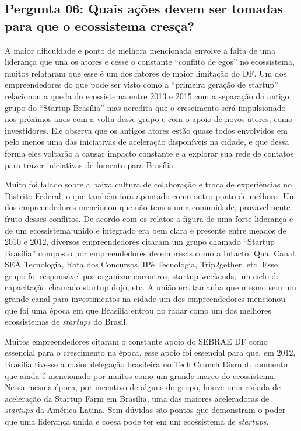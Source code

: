 \subsection*{Pergunta 06: Quais ações devem ser tomadas para que o ecossistema cresça?}
\label{subsection:pergunta_de_pesquisa_6}

A maior dificuldade e ponto de melhora mencionada envolve a falta de uma liderança que una os atores e cesse o constante ``conflito de egos'' no ecossistema, muitos relataram que esse é um dos fatores de maior limitação do DF. Um dos empreendedores do que pode ser visto como a ``primeira geração de startup'' relacionou a queda do ecossistema entre 2013 e 2015 com a separação do antigo grupo do ``Startup Brasília'' mas acredita que o crescimento será impulsionado nos próximos anos com a volta desse grupo e com o apoio de novos atores, como investidores. Ele observa que os antigos atores estão quase todos envolvidos em pelo menos uma das iniciativas de aceleração disponíveis na cidade, e que dessa forma eles voltarão a causar impacto constante e a explorar sua rede de contatos para trazer iniciativas de fomento para Brasília.  

Muito foi falado sobre a baixa cultura de colaboração e troca de experiências no Distrito Federal, o que também fora apontado como outro ponto de melhora. Um dos empreendedores mencionou que não temos uma comunidade, provavelmente fruto desses conflitos. De acordo com os relatos a figura de uma forte liderança e de um ecossistema unido e integrado era bem clara e presente entre meados de 2010 e 2012, diversos empreendedores citaram um grupo chamado ``Startup Brasília'' composto por empreendedores de empresas como a Intacto, Qual Canal, SEA Tecnologia, Rota dos Concursos, IPê Tecnologia, Trip2gether, etc. Esse grupo foi responsável por organizar encontros, startup weekends, um ciclo de capacitação chamado startup dojo, etc. A união era tamanha que mesmo sem um grande canal para investimentos na cidade um dos empreendedores mencionou que foi uma época em que Brasília entrou no radar como um dos melhores ecossistemas de \textit{startups} do Brasil. 

Muitos empreendedores citaram o constante apoio do SEBRAE DF como essencial para o crescimento na época, esse apoio foi essencial para que, em 2012, Brasília tivesse a maior delegação brasileira no Tech Crunch Disrupt, momento que ainda é mencionado por muitos como um grande marco do ecossistema. Nessa mesma época, por incentivo de alguns do grupo, houve uma rodada de aceleração da Startup Farm em Brasília, uma das maiores aceleradoras de \textit{startups} da América Latina. Sem dúvidas são pontos que demonstram o poder que uma liderança unida e coesa pode ter em um ecossistema de \textit{startups}. 


